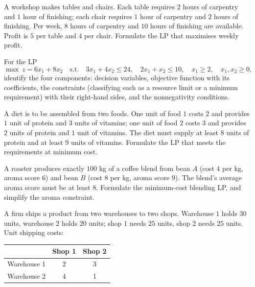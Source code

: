 \begin{problems}
  \item A workshop makes tables and chairs. Each table requires $2$ hours
        of carpentry and $1$ hour of finishing; each chair requires $1$
        hour of carpentry and $2$ hours of finishing. Per week, $8$ hours
        of carpentry and $10$ hours of finishing are available. Profit is
        $5$ per table and $4$ per chair. Formulate the LP that maximises
        weekly profit.
  \item For the LP
        \[
          \max\ z=6x_1+8x_2
          \quad\text{s.t.}\quad
          3x_1+4x_2\le 24,\quad 2x_1+x_2\le 10,\quad x_1\ge 2,\quad
          x_1,x_2\ge 0,
        \]
        identify the four components: decision variables, objective
        function with its coefficients, the constraints (classifying each
        as a resource limit or a minimum requirement) with their
        right-hand sides, and the nonnegativity conditions.
  \item A diet is to be assembled from two foods. One unit of food $1$
        costs $2$ and provides $1$ unit of protein and $3$ units of
        vitamins; one unit of food $2$ costs $3$ and provides $2$ units of
        protein and $1$ unit of vitamins. The diet must supply at least
        $8$ units of protein and at least $9$ units of vitamins. Formulate
        the LP that meets the requirements at minimum cost.
  \item A roaster produces exactly $100$ kg of a coffee blend from bean
        $A$ (cost $4$ per kg, aroma score $6$) and bean $B$ (cost $8$ per
        kg, aroma score $9$). The blend's average aroma score must be at
        least $8$. Formulate the minimum-cost blending LP, and simplify
        the aroma constraint.
  \item A firm ships a product from two warehouses to two shops.
        Warehouse $1$ holds $30$ units, warehouse $2$ holds $20$ units;
        shop $1$ needs $25$ units, shop $2$ needs $25$ units. Unit
        shipping costs:
        \begin{center}
        \begin{tabular}{|l|c|c|}
          \hline
           & Shop 1 & Shop 2\\
          \hline
          Warehouse 1 & 2 & 3\\
          Warehouse 2 & 4 & 1\\
          \hline
        \end{tabular}
        \end{center}

\end{problems}

